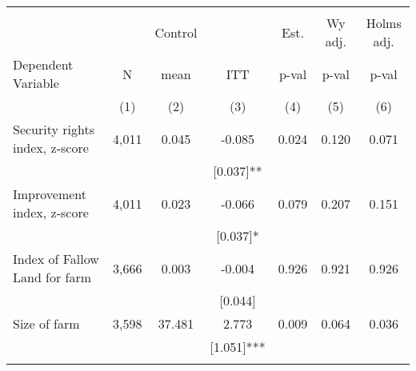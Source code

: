 \begin{tabular}{lcccccc}
\hline \noalign{\smallskip} &  &  &  &  &  & \\
 &  & Control &  & Est. & Wy adj. & Holms adj.\\
Dependent Variable & N & mean & ITT & p-val & p-val & p-val\\
 & (1) & (2) & (3) & (4) & (5) & (6)\\
\noalign{\smallskip}\hline \noalign{\smallskip}Security rights index, z-score & 4,011 & 0.045 & -0.085 & 0.024 & 0.120 & 0.071\\
 &  &  & [0.037]** &  &  & \\
Improvement index, z-score & 4,011 & 0.023 & -0.066 & 0.079 & 0.207 & 0.151\\
 &  &  & [0.037]* &  &  & \\
Index of Fallow Land for farm & 3,666 & 0.003 & -0.004 & 0.926 & 0.921 & 0.926\\
 &  &  & [0.044] &  &  & \\
Size of farm & 3,598 & 37.481 & 2.773 & 0.009 & 0.064 & 0.036\\
 &  &  & [1.051]*** &  &  & \\
\noalign{\smallskip}\hline\end{tabular}
